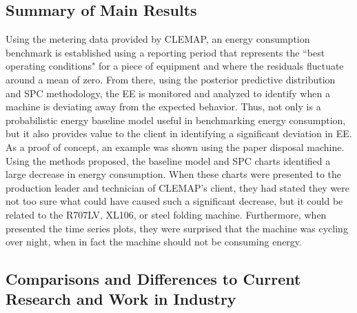 \subsection{Summary of Main Results}

Using the metering data provided by CLEMAP, an energy consumption benchmark is established using a reporting period that represents the ``best operating conditions" for a piece of equipment and where the residuals fluctuate around a mean of zero. From there, using the posterior predictive distribution and SPC methodology, the EE is monitored and analyzed to identify when a machine is deviating away from the expected behavior. Thus, not only is a probabilistic energy baseline model useful in benchmarking energy consumption, but it also provides value to the client in identifying a significant deviation in EE. As a proof of concept, an example was shown using the paper disposal machine. Using the methods proposed, the baseline model and SPC charts identified a large decrease in energy consumption. When these charts were presented to the production leader and technician of CLEMAP's client, they had stated they were not too sure what could have caused such a significant decrease, but it could be related to the R707LV, XL106, or steel folding machine. Furthermore, when presented the time series plots, they were surprised that the machine was cycling over night, when in fact the machine should not be consuming energy.

\subsection{Comparisons and Differences to Current Research and Work in Industry}

